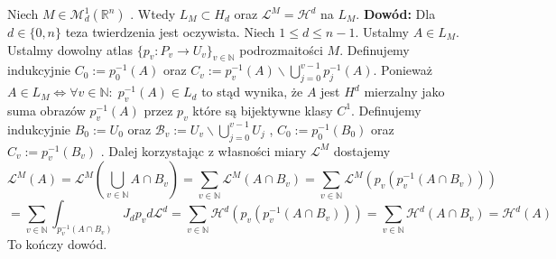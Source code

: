\begin{tw}
	Niech $M \in \mathcal{M}^1_d(\mathbb{R}^n)$ . Wtedy $L_M \subset H_d$ oraz $\mathcal{L}^M = \mathcal{H}^d$ na $L_M$.
	\newline\newline
	\textbf{Dowód:}\newline
	Dla $d \in \{0, n\}$ teza twierdzenia jest oczywista. Niech $1 \leq d \leq n -1$.
	Ustalmy $A \in L_M$. Ustalmy dowolny atlas $\{p_v: P_v \rightarrow U_v\}_{v \in \mathbb{N}}$ podrozmaitości $M$. Definujemy indukcyjnie $C_0:=p_0^{-1}(A)$ oraz $C_v := p_v^{-1}(A) \backslash \bigcup_{j=0}^{v-1} p_j^{-1}(A)$. Ponieważ $A \in L_M \Leftrightarrow \forall v \in \mathbb{N}: \; p_v^{-1}(A) \in L_d$ to stąd wynika, że $A$ jest $H^d$ mierzalny jako suma obrazów $p_v^{-1}(A)$ przez $p_v$ które są bijektywne klasy $C^1$. 
	Definujemy indukcyjnie $B_0:=U_0$ oraz $\mathcal{B}_v := U_v \backslash \bigcup_{j=0}^{v-1} U_j$ , $C_0:=p_0^{-1}(B_0)$ oraz $C_v := p_v^{-1}(B_v)$ .  Dalej korzystając z własności miary $\mathcal{L}^M$ dostajemy 
	$$
		\mathcal{L}^M(A) = \mathcal{L}^M(\bigcup_{v \in \mathbb{N}} A \cap B_v) 
		= \sum_{v \in \mathbb{N}} \mathcal{L}^M(A \cap B_v) 
		= \sum_{v \in \mathbb{N}} \mathcal{L}^M(p_v(p_v^{-1}(A \cap B_v))) 
	$$
	$$
		= \sum_{v \in \mathbb{N}} \int_{p_v^{-1}(A \cap B_v)} J_d p_v d \mathcal{L}^d
		= \sum_{v \in \mathbb{N}} \mathcal{H}^d(p_v(p_v^{-1}(A \cap B_v))) 
		= \sum_{v \in \mathbb{N}} \mathcal{H}^d(A \cap B_v) 
		= \mathcal{H}^d(A)
	$$
	To kończy dowód.
\end{tw}